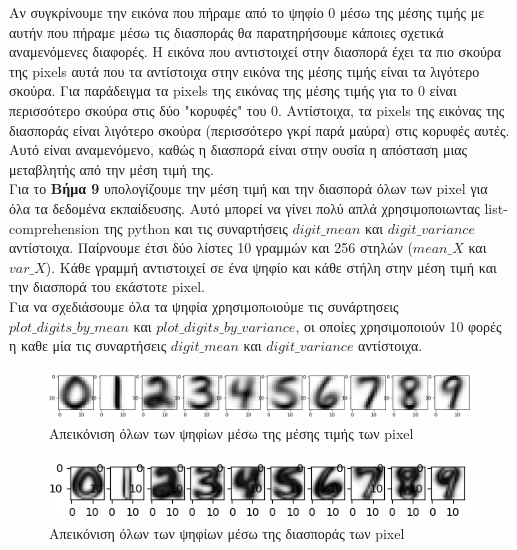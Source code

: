 \documentclass[11pt]{article} %
\begin{document}
Αν συγκρίνουμε την εικόνα που πήραμε από το ψηφίο 0 μέσω της μέσης τιμής με αυτήν που πήραμε μέσω τις διασποράς θα παρατηρήσουμε κάποιες σχετικά αναμενόμενες διαφορές. Η εικόνα που αντιστοιχεί στην διασπορά έχει τα πιο σκούρα της pixels αυτά που τα αντίστοιχα στην εικόνα της μέσης τιμής είναι τα λιγότερο σκούρα. Για παράδειγμα τα pixels της εικόνας της μέσης τιμής για το $0$ είναι περισσότερο σκούρα στις δύο "κορυφές" του $0$. Αντίστοιχα, τα pixels της εικόνας της διασποράς είναι λιγότερο σκούρα (περισσότερο γκρί παρά μαύρα) στις κορυφές αυτές. Αυτό είναι αναμενόμενο, καθώς η διασπορά είναι στην ουσία η απόσταση μιας μεταβλητής από την μέση τιμή της. \\

Για το \textbf{Βήμα 9} υπολογίζουμε την μέση τιμή και την διασπορά όλων των pixel για όλα τα δεδομένα εκπαίδευσης. Αυτό μπορεί να γίνει πολύ απλά χρησιμοποιωντας list-comprehension της python και τις συναρτήσεις $digit\_mean$ και $digit\_variance$ αντίστοιχα. Παίρνουμε έτσι δύο λίστες 10 γραμμών και 256 στηλών ($mean\_X$ και $var\_X$). Κάθε γραμμή αντιστοιχεί σε ένα ψηφίο και κάθε στήλη στην μέση τιμή και την διασπορά του εκάστοτε pixel. \\

Για να σχεδιάσουμε όλα τα ψηφία χρησιμοπoιούμε τις συνάρτησεις  $plot\_digits\_by\_mean$ και $plot\_digits\_by\_variance$, οι οποίες χρησιμοποιούν 10 φορές η καθε μία τις συναρτήσεις $digit\_mean$ και $digit\_variance$ αντίστοιχα. 

\begin{figure}[H]
    \centering
    \includegraphics[width=1.1\textwidth]{plots/all_digits_mean}
    \caption{Απεικόνιση όλων των ψηφίων μέσω της μέσης τιμής των pixel}
    \label{fig:all_mean}
\end{figure}

\begin{figure}[H]
    \centering
    \includegraphics[width=1.1\textwidth]{plots/all_digits_variance}
    \caption{Απεικόνιση όλων των ψηφίων μέσω της διασποράς των pixel}
    \label{fig:all_mean}
\end{figure}
\end{document}

